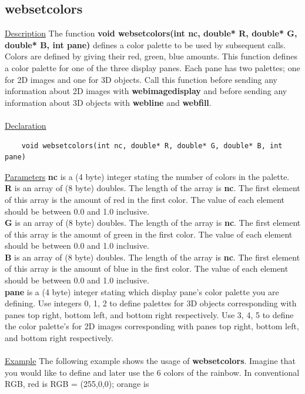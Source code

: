 \subsection{websetcolors}
\underline{Description} The function \textbf{void websetcolors(int nc, double* R, double* G, double* B, int pane)} 
defines a color palette to be used by subsequent calls. Colors are defined by giving their red, green, blue amounts.
This function defines a color palette for one of the three display panes. Each pane has two palettes; one for 2D images and
one for 3D objects. Call this function before sending any information about
2D images with \textbf{webimagedisplay} and before sending any information about 3D objects with \textbf{webline} and
\textbf{webfill}.\\
\\
\underline{Declaration} 
\begin{verbatim} 
    void websetcolors(int nc, double* R, double* G, double* B, int pane)
\end{verbatim}
\underline{Parameters} \textbf{nc} is a (4 byte) integer stating the number of colors in the palette.\\
\textbf{R} is an array of (8 byte) doubles. The length of the array is \textbf{nc}. The first element of this array
is the amount of red in the first color. The value of each element should be between 0.0 and 1.0 inclusive.\\
\textbf{G} is an array of (8 byte) doubles. The length of the array is \textbf{nc}. The first element of this array
is the amount of green in the first color.  The value of each element should be between 0.0 and 1.0 inclusive.\\
\textbf{B} is an array of (8 byte) doubles. The length of the array is \textbf{nc}. The first element of this array
is the amount of blue in the first color.  The value of each element should be between 0.0 and 1.0 inclusive.\\
\textbf{pane} is a (4 byte) integer stating which display pane's color palette you are defining. Use integers
0, 1, 2 to define palettes for 3D objects corresponding with panes top right, bottom left, and bottom right respectively. 
Use 3, 4, 5 to define the color palette's for 2D images corresponding with panes top right, bottom left, and bottom 
right respectively.\\
\\
\underline{Example} The following example shows the usage of \textbf{websetcolors}. Imagine that you would like
to define and later use the 6 colors of the rainbow. In conventional RGB, red is RGB = (255,0,0); orange is 
